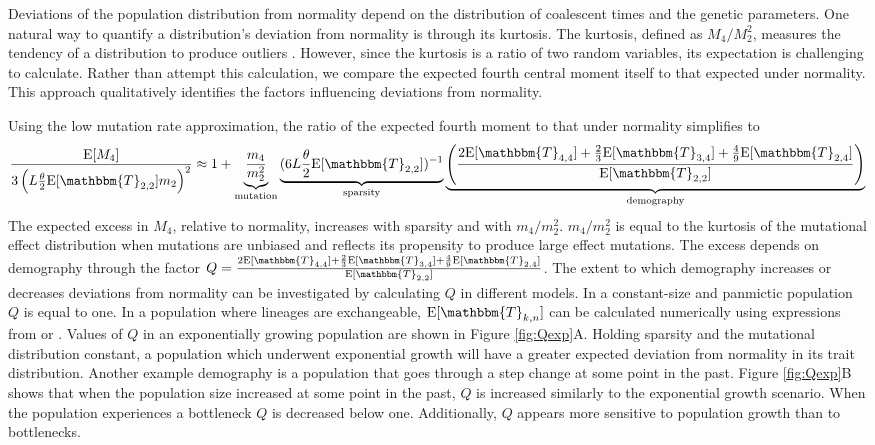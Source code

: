 Deviations of the population distribution from normality depend on the
distribution of coalescent times and the genetic parameters. One natural way to
quantify a distribution's deviation from normality is through its kurtosis. The
kurtosis, defined as $M_4/M_2^2$, measures the tendency of a
distribution to produce outliers \citep{Westfall2014}. However, since the
kurtosis is a ratio of two random variables, its expectation is challenging to
calculate. Rather than attempt this calculation, we compare the expected fourth
central moment itself to that expected under normality. This approach
qualitatively identifies the factors influencing deviations from normality.

Using the low mutation rate approximation, the ratio of the expected fourth
moment to that under normality simplifies to
\begin{equation}
  \label{eq:popmom4coal}
  \frac{\E[M_4]}{3\left(L \T \E[\mathbbm{T}_{2,2}] m_2\right)^2} \approx 1 +
  \underbrace{\frac{m_4}{m_2^2}}_{\text{mutation}} \underbrace{(6 L \T \E[\mathbbm{T}_{2,2}])^{-1}}_{\text{sparsity}}
      \underbrace{\left( \frac{2\E[\mathbbm{T}_{4,4}] +
      \frac{2}{3}\E[\mathbbm{T}_{3,4}] +
      \frac{4}{9}\E[\mathbbm{T}_{2,4}]}{\E[\mathbbm{T}_{2,2}]}\right)}_{\text{demography}}
\end{equation}
The expected excess in $M_4$, relative to normality, increases with sparsity and
with $m_4/m_2^2$. $m_4/m_2^2$ is equal to the kurtosis of the mutational effect
distribution when mutations are unbiased and reflects its propensity to produce
large effect mutations. The excess depends on demography through the factor $Q
= \frac{2\E[\mathbbm{T}_{4,4}] + \frac{2}{3}\E[\mathbbm{T}_{3,4}]
+ \frac{4}{9}\E[\mathbbm{T}_{2,4}]}{\E[\mathbbm{T}_{2,2}]}$. The extent to which
demography increases or decreases deviations from normality can be investigated
by calculating $Q$ in different models. In a constant-size and panmictic
population $Q$ is equal to one. In a population where lineages are exchangeable,
$\E[\mathbbm{T}_{k,n}]$ can be calculated numerically using expressions from
\citet{Griffiths1998} or \citet{Polanski2003a}. Values of $Q$ in an exponentially growing population are
shown in Figure \ref{fig:Qexp}A. Holding sparsity and the mutational
distribution constant, a population which underwent exponential growth will have
a greater expected deviation from normality in its trait distribution. Another
example demography is a population that goes through a step change at some point
in the past. Figure \ref{fig:Qexp}B shows that when the population size
increased at some point in the past, $Q$ is increased similarly to the
exponential growth scenario. When the population experiences a bottleneck $Q$ is
decreased below one. Additionally, $Q$ appears more sensitive to population
growth than to bottlenecks.

